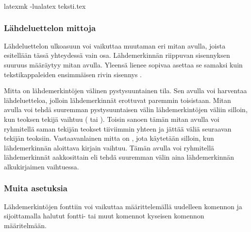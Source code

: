 \begin{koodilohkosis}
latexmk -lualatex teksti.tex    %
\end{koodilohkosis}

\subsubsection{Lähdeluettelon mittoja}

Lähdeluettelon ulkoasuun voi vaikuttaa muutaman eri mitan avulla, joista
esitellään tässä yhteydessä vain osa. Lähdemerkinnän riippuvan
sisennyksen suuruus määräytyy mitan  avulla. Yleensä
lienee sopivaa asettaa se samaksi kuin tekstikappaleiden ensimmäisen
rivin sisennys .

\begin{koodilohkosis}
\setlength{\parindent}{1.1em} %
\setlength{\bibhang}{\parindent}
\end{koodilohkosis}

\noindent
Mitta  on lähdemerkintöjen välinen pystysuuntainen
tila.  Sen avulla voi harventaa lähdeluetteloa,
jolloin lähdemerkinnät erottuvat paremmin toisistaan. Mitan
 avulla voi tehdä suuremman pystysuuntaisen välin
lähdemerkintöjen väliin silloin, kun teoksen tekijä vaihtuu
( tai ). Toisin sanoen tämän mitan avulla
voi ryhmitellä saman tekijän teokset tiiviimmin yhteen ja jättää väliä
seuraavan tekijän teoksiin. Vastaavanlainen mitta on
, jota käytetään silloin, kun lähdemerkinnän
aloittava kirjain vaihtuu. Tämän avulla voi ryhmitellä lähdemerkinnät
aakkosittain eli tehdä suuremman välin aina lähdemerkinnän alkukirjaimen
vaihtuessa.

\begin{koodilohkosis}
\setlength{\bibitemsep}{.5ex plus .1ex minus .1ex}
\setlength{\bibnamesep}{1em  plus .2ex minus .1ex}
\setlength{\bibinitsep}{2em  plus .2ex minus .1ex}
\end{koodilohkosis}

\subsubsection{Muita asetuksia}

Lähdemerkintöjen fonttiin voi vaikuttaa määrittelemällä uudelleen
komennon  ja sijoittamalla halutut fontti- tai muut
komennot kyseisen komennon määritelmään.

